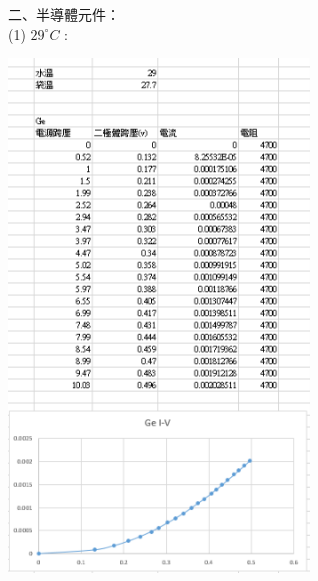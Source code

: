 \documentclass[UTF8]{ctexart}
\begin{document}
\begin{CJK*}{UTF8}{song}
二、半導體元件： \\
(1) $29^{\circ}C$ : \\


\begin{minipage}[t]{0.48\textwidth}
\centering %
\includegraphics[width = 0.6\textwidth]{29ge.png}
\end{minipage} %
\begin{minipage}[t]{0.48\textwidth}
\centering

\end{minipage}
\end{CJK*}
\end{document}
